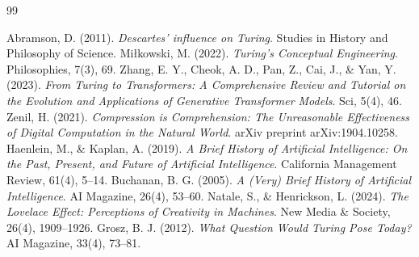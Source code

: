\documentclass[12pt,a4paper]{article}
\begin{document}
\vspace{0.5cm}
\begin{thebibliography}{99}

 Abramson, D. (2011). \textit{Descartes' influence on Turing}. Studies in History and Philosophy of Science.
 Mi{\l}kowski, M. (2022). \textit{Turing's Conceptual Engineering}. Philosophies, 7(3), 69.
 Zhang, E. Y., Cheok, A. D., Pan, Z., Cai, J., \& Yan, Y. (2023). \textit{From Turing to Transformers: A Comprehensive Review and Tutorial on the Evolution and Applications of Generative Transformer Models}. Sci, 5(4), 46.
 Zenil, H. (2021). \textit{Compression is Comprehension: The Unreasonable Effectiveness of Digital Computation in the Natural World}. arXiv preprint arXiv:1904.10258.
 Haenlein, M., \& Kaplan, A. (2019). \textit{A Brief History of Artificial Intelligence: On the Past, Present, and Future of Artificial Intelligence}. California Management Review, 61(4), 5--14.
 Buchanan, B. G. (2005). \textit{A (Very) Brief History of Artificial Intelligence}. AI Magazine, 26(4), 53--60.
 Natale, S., \& Henrickson, L. (2024). \textit{The Lovelace Effect: Perceptions of Creativity in Machines}. New Media \& Society, 26(4), 1909--1926.
 Grosz, B. J. (2012). \textit{What Question Would Turing Pose Today?} AI Magazine, 33(4), 73--81.

\end{thebibliography}
\end{document}
